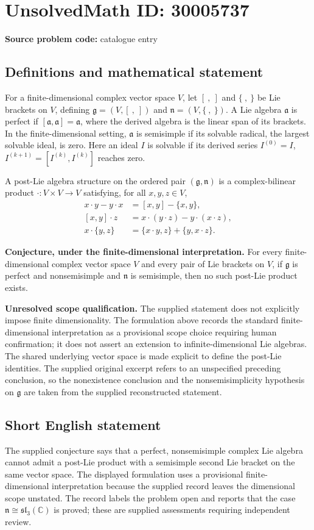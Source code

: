 \documentclass[11pt]{article}
\newcommand{\C}{\mathbb{C}}
\begin{document}
\section*{UnsolvedMath ID: 30005737}
\textbf{Source problem code:} catalogue entry
\subsection{Definitions and mathematical statement}
For a finite-dimensional complex vector space \(V\), let \([\ ,\ ]\) and \(\{\ ,\ \}\) be Lie brackets on \(V\), defining \(\mathfrak g=(V,[\ ,\ ])\) and \(\mathfrak n=(V,\{\ ,\ \})\). A Lie algebra \(\mathfrak a\) is perfect if \([\mathfrak a,\mathfrak a]=\mathfrak a\), where the derived algebra is the linear span of its brackets. In the finite-dimensional setting, \(\mathfrak a\) is semisimple if its solvable radical, the largest solvable ideal, is zero. Here an ideal \(I\) is solvable if its derived series \(I^{(0)}=I\), \(I^{(k+1)}=[I^{(k)},I^{(k)}]\) reaches zero.

A post-Lie algebra structure on the ordered pair \((\mathfrak g,\mathfrak n)\) is a complex-bilinear product \(\cdot:V\times V\to V\) satisfying, for all \(x,y,z\in V\),
\[
\begin{aligned}
x\cdot y-y\cdot x&=[x,y]-\{x,y\},\\
[x,y]\cdot z&=x\cdot(y\cdot z)-y\cdot(x\cdot z),\\
x\cdot\{y,z\}&=\{x\cdot y,z\}+\{y,x\cdot z\}.
\end{aligned}
\]

\textbf{Conjecture, under the finite-dimensional interpretation.} For every finite-dimensional complex vector space \(V\) and every pair of Lie brackets on \(V\), if \(\mathfrak g\) is perfect and nonsemisimple and \(\mathfrak n\) is semisimple, then no such post-Lie product exists.

\textbf{Unresolved scope qualification.} The supplied statement does not explicitly impose finite dimensionality. The formulation above records the standard finite-dimensional interpretation as a provisional scope choice requiring human confirmation; it does not assert an extension to infinite-dimensional Lie algebras. The shared underlying vector space is made explicit to define the post-Lie identities. The supplied original excerpt refers to an unspecified preceding conclusion, so the nonexistence conclusion and the nonsemisimplicity hypothesis on \(\mathfrak g\) are taken from the supplied reconstructed statement.
\subsection{Short English statement}
The supplied conjecture says that a perfect, nonsemisimple complex Lie algebra cannot admit a post-Lie product with a semisimple second Lie bracket on the same vector space. The displayed formulation uses a provisional finite-dimensional interpretation because the supplied record leaves the dimensional scope unstated. The record labels the problem open and reports that the case \(\mathfrak n\cong\mathfrak{sl}_3(\C)\) is proved; these are supplied assessments requiring independent review.
\end{document}

